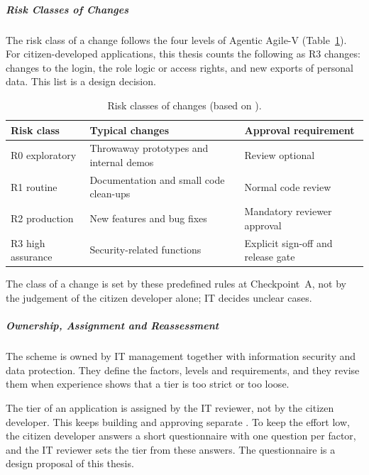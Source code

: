 \documentclass[10pt,a4paper]{article}
\begin{document}
\subparagraph{Risk Classes of Changes}

The risk class of a change follows the four levels of Agentic Agile-V
\parencite{koch2026agentic} (Table~\ref{tab:change-classes}). For
citizen-developed applications, this thesis counts the following as R3
changes: changes to the login, the role logic or access rights, and new
exports of personal data. This list is a design decision.

\begin{table}[H]
    \centering
    \small
    \caption{Risk classes of changes (based on
    \textcite{koch2026agentic}).}
    \label{tab:change-classes}
    \begin{tabular}{@{}p{3.2cm} p{6.2cm} p{4.2cm}@{}}
    \toprule
    \textbf{Risk class} & \textbf{Typical changes} &
        \textbf{Approval requirement} \\
    \midrule
    R0 exploratory & Throwaway prototypes and internal demos & Review
        optional \\
    \addlinespace
    R1 routine & Documentation and small code clean-ups & Normal code
        review \\
    \addlinespace
    R2 production & New features and bug fixes & Mandatory reviewer
        approval \\
    \addlinespace
    R3 high assurance & Security-related functions & Explicit sign-off
        and release gate \\
    \bottomrule
    \end{tabular}
\end{table}

The class of a change is set by these predefined rules at Checkpoint~A,
not by the judgement of the citizen developer alone; IT decides unclear
cases.

\subparagraph{Ownership, Assignment and Reassessment}

The scheme is owned by IT management together with information security
and data protection. They define the factors, levels and requirements,
and they revise them when experience shows that a tier is too strict or
too loose.

The tier of an application is assigned by the IT reviewer, not by the
citizen developer. This keeps building and approving separate
\parencite{kang2026}. To keep the effort low, the citizen developer
answers a short questionnaire with one question per factor, and the IT
reviewer sets the tier from these answers. The questionnaire is a design
proposal of this thesis.
\end{document}
